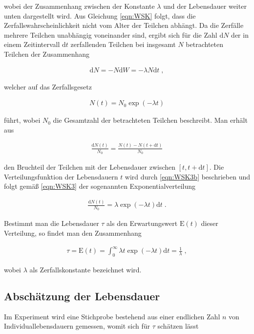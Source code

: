 wobei der Zusammenhang zwischen der Konstante $\lambda$ und der Lebensdauer weiter unten dargestellt wird. Aus Gleichung \eqref{eqn:WSK} folgt, dass die Zerfallswahrscheinlichkeit nicht vom Alter der Teilchen abhängt. Da die Zerfälle mehrere Teilchen unabhängig voneinander sind, ergibt sich für die Zahl $\textrm{d}N$ der in einem Zeitintervall $\textrm{d}t$ zerfallenden Teilchen bei insgesamt $N$ betrachteten Teilchen der Zusammenhang

\begin{align}
\textrm{d}N = - N\textrm{d}W = - \lambda N \textrm{d}t \;, \label{eqn:WSK2}
\end{align}

welcher auf das Zerfallsgesetz

\begin{align}
N(t) = N_0 \exp(-\lambda t) \label{eqn:WSK3}
\end{align}

führt, wobei $N_0$ die Gesamtzahl der betrachteten Teilchen beschreibt. Man erhält aus 

\begin{align}
\frac{\textrm{d} N\left(t\right)}{N_0} = \frac{N(t) - N\left(t+\textrm{d}t\right)}{N_0} \label{eqn:WSK3b}
\end{align}

den Bruchteil der Teilchen mit der Lebensdauer zwischen $[t, t + \textrm{d}t]$. Die Verteilungsfunktion der Lebensdauern $t$ wird durch \eqref{eqn:WSK3b} beschrieben und folgt gemäß \eqref{eqn:WSK3} der sogenannten Exponentialverteilung

\begin{align}
\frac{\textrm{d}N(t)}{N_0} = \lambda\exp(-\lambda t) \textrm{d}t \label{eqn:WSK4} \;.
\end{align}

Bestimmt man die Lebensdauer $\tau$ als den Erwartungswert $\textrm{E}(t)$ dieser Verteilung, so findet man den Zusammenhang

\begin{align}
\tau = \textrm{E}(t) = \int_0^{\infty} \lambda t \exp (-\lambda t) \textrm{d}t = \frac{1}{\lambda}\;,
\end{align}

wobei $\lambda$ als Zerfallskonstante bezeichnet wird. 

\subsection{Abschätzung der Lebensdauer}
Im Experiment wird eine Stichprobe bestehend aus einer endlichen Zahl $n$ von Individuallebensdauern gemessen, womit sich für $\tau$ schätzen lässt

